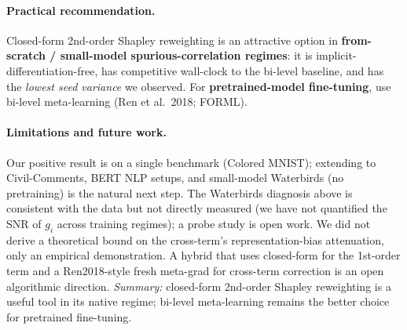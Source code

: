 \paragraph{Practical recommendation.}
Closed-form 2nd-order Shapley reweighting is an attractive option in
\textbf{from-scratch / small-model spurious-correlation regimes}: it is
implicit-differentiation-free, has competitive wall-clock to the
bi-level baseline, and has the \emph{lowest seed variance} we observed.
For \textbf{pretrained-model fine-tuning}, use bi-level meta-learning
(Ren et al.~2018; FORML).

\paragraph{Limitations and future work.}
Our positive result is on a single benchmark (Colored MNIST); extending
to Civil-Comments, BERT NLP setups, and small-model Waterbirds (no
pretraining) is the natural next step. The Waterbirds diagnosis above
is consistent with the data but not directly measured (we have not
quantified the SNR of $g_i$ across training regimes); a probe study
is open work. We did not derive a theoretical bound on the
cross-term's representation-bias attenuation, only an empirical
demonstration. A hybrid that uses closed-form for the 1st-order term
and a Ren2018-style fresh meta-grad for cross-term correction is an
open algorithmic direction. \emph{Summary:} closed-form 2nd-order
Shapley reweighting is a useful tool in its native regime;
bi-level meta-learning remains the better choice for pretrained
fine-tuning.

